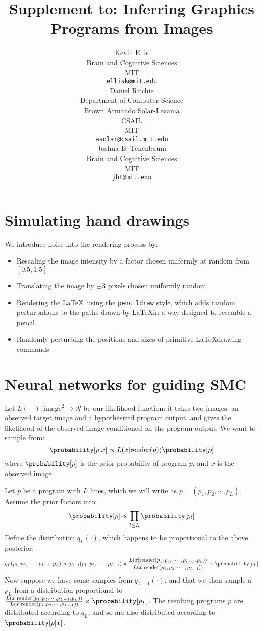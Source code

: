 \documentclass{article}
\title{Supplement to: Inferring Graphics Programs from Images}
\author{
Kevin Ellis \\
Brain and Cognitive Sciences\\
MIT\\
\texttt{ellisk@mit.edu} \\
Daniel Ritchie\\
Department of Computer Science\\
Brown
\And
Armando Solar-Lezama \\
  CSAIL\\
MIT \\
\texttt{asolar@csail.mit.edu} \\
\And
Joshua B. Tenenbaum \\
Brain and Cognitive Sciences\\
MIT\\
\texttt{jbt@mit.edu} \\
}
\begin{document}

\maketitle

\section{Simulating hand drawings}

We introduce noise into the rendering process by:

\begin{itemize}
\item Rescaling the image intensity by a factor chosen uniformly at random from $[0.5,1.5]$
\item Translating the image by $\pm 3$ pixels chosen uniformly random
\item Rendering the \LaTeX~using the \verb|pencildraw| style,
  which adds random perturbations to the paths drawn by \LaTeX in a way designed to resemble a pencil.
\item Randomly perturbing the positions and sizes of primitive  \LaTeX drawing commands
  \end{itemize}

\section{Neural networks for guiding SMC}



Let $L(\cdot | \cdot):\text{image}^2\to \mathcal{R}$ be our likelihood
function: it takes two images, an observed target image and a
hypothesized program output, and gives the likelihood of the observed
image conditioned on the program output. We want to sample from:
\begin{equation}
\probability [p|x]  \propto L(x | \text{render}(p)) \probability [p]
\end{equation}
where $\probability [p]$ is the prior probability of program $p$, and $x$ is the observed image.

Let $p$ be a program with $L$ lines, which we will write as $p = (p_1,p_2,\cdots,p_L)$. Assume the prior factors into:
\begin{equation}
  \probability [p]\propto \prod_{l\leq L}\probability [p_l]
\end{equation}
Define the distribution $q_L(\cdot)$, which happens to be proportional to the above posterior:
\begin{equation}
  q_L(p_1,p_2,\cdots,p_{L - 1},p_L)\propto q_{L - 1}(p_1,p_2,\cdots,p_{L - 1})\times \frac{L(x | \text{render}(p_1,p_2,\cdots,p_{L - 1},p_L))}{L(x | \text{render}(p_1,p_2,\cdots,p_{L - 1}))}\times\probability [p_L]
\end{equation}
Now suppose we have some samples from $q_{L - 1}(\cdot)$, and that we
then sample a $p_L$ from a distribution proportional to $\frac{L(x |
  \text{render}(p_1,p_2,\cdots,p_{L - 1},p_L))}{L(x |
  \text{render}(p_1,p_2,\cdots,p_{L - 1}))}\times\probability [p_L]$.
The resulting programs $p$ are distributed according to $q_L$, and so
are also distributed according to $\probability [p|x]$.
\end{document}
